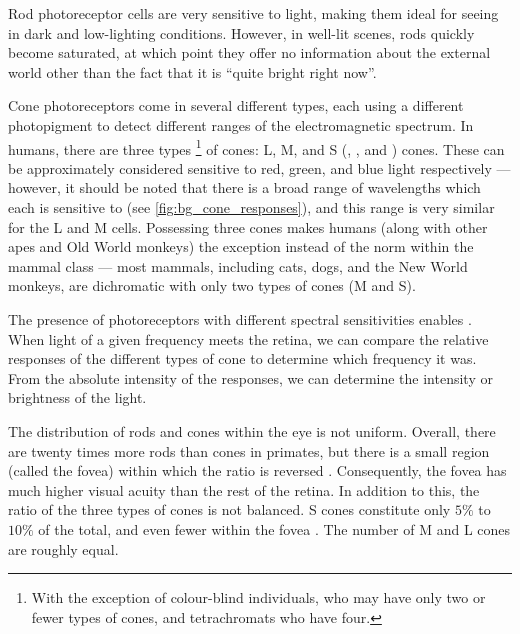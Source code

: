 Rod photoreceptor cells are very sensitive to light, making them ideal for seeing in dark and low-lighting conditions.
However, in well-lit scenes, rods quickly become saturated, at which point they offer no information about the external world other than the fact that it is ``quite bright right now''.

Cone photoreceptors come in several different types, each using a different photopigment to detect different ranges of the electromagnetic spectrum.
In humans, there are three types%
\footnote{With the exception of colour-blind individuals, who may have only two or fewer types of cones, and tetrachromats \citep{Nagy1981,Jordan1993,Jameson2001} who have four.}
of cones:
\acl{L}, \acl{M}, and \acl{S} (, , and ) cones.
These can be approximately considered sensitive to red, green, and blue light respectively --- however, it should be noted that there is a broad range of wavelengths which each is sensitive to (see \autoref{fig:bg_cone_responses}), and this range is very similar for the \ac{L} and \ac{M} cells.
Possessing three cones makes humans (along with other apes and Old World monkeys) the exception instead of the norm within the mammal class --- most mammals, including cats, dogs, and the New World monkeys, are dichromatic with only two types of cones (\ac{M} and \ac{S}).

The presence of photoreceptors with different spectral sensitivities enables .
When light of a given frequency meets the retina, we can compare the relative responses of the different types of cone to determine which frequency it was.
From the absolute intensity of the responses, we can determine the intensity or brightness of the light.

The distribution of rods and cones within the eye is not uniform.
Overall, there are twenty times more rods than cones in primates, but there is a small region (called the fovea) within which the ratio is reversed \citep[Chapter~11]{nsbook}.
Consequently, the fovea has much higher visual acuity than the rest of the retina.
In addition to this, the ratio of the three types of cones is not balanced.
\ac{S} cones constitute only $5\%$ to $10\%$ of the total, and even fewer within the fovea \citep[Chapter~11]{nsbook}.
The number of \ac{M} and \ac{L} cones are roughly equal.


